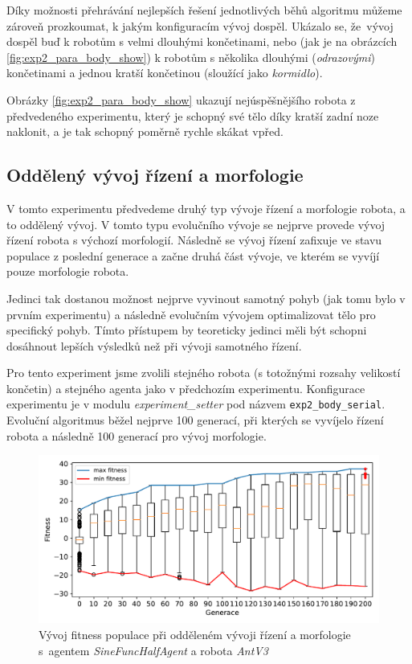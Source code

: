 Díky možnosti přehrávání nejlepších řešení jednotlivých běhů algoritmu můžeme
zároveň prozkoumat, k jakým konfiguracím vývoj dospěl. Ukázalo se, že~vývoj
dospěl buď k robotům s velmi dlouhými končetinami, nebo (jak je na obrázcích
\ref{fig:exp2_para_body_show}) k robotům s několika dlouhými
(\emph{odrazovými}) končetinami a jednou kratší končetinou (sloužící jako
\emph{kormidlo}). 

Obrázky \ref{fig:exp2_para_body_show} ukazují nejúspěšnějšího robota z
předvedeného experimentu, který je schopný své tělo díky kratší zadní noze
naklonit, a je tak schopný poměrně rychle skákat vpřed.

\subsection{Oddělený vývoj řízení a morfologie} \label{exp2:split_evo}
V tomto experimentu předvedeme druhý typ vývoje řízení a morfologie robota, a
to oddělený vývoj. V tomto typu evolučního vývoje se nejprve provede vývoj
řízení robota s výchozí morfologií. Následně se vývoj řízení zafixuje ve stavu
populace z poslední generace a začne druhá část vývoje, ve kterém se vyvíjí
pouze morfologie robota.

Jedinci tak dostanou možnost nejprve vyvinout samotný pohyb (jak tomu bylo v
prvním experimentu) a následně evolučním vývojem optimalizovat tělo pro
specifický pohyb. Tímto přístupem by teoreticky jedinci měli být schopni
dosáhnout lepších výsledků než při vývoji samotného řízení.

Pro tento experiment jsme zvolili stejného robota (s totožnými rozsahy
velikostí končetin) a stejného agenta jako v předchozím experimentu.
Konfigurace experimentu je v modulu \emph{experiment\_setter} pod
názvem \texttt{exp2\_body\_serial}. Evoluční algoritmus běžel nejprve 100
generací, při kterých se vyvíjelo řízení robota a následně 100 generací pro
vývoj morfologie.

\begin{figure}[h!]
    \includegraphics[width=1\textwidth]{../img/experiment2_serial_10ticks.pdf}
    \caption{Vývoj fitness populace při odděleném vývoji řízení a morfologie
    s~agentem \emph{SineFuncHalfAgent} a robota \emph{AntV3}}
    \label{exp:exp2_serial}
\end{figure}

